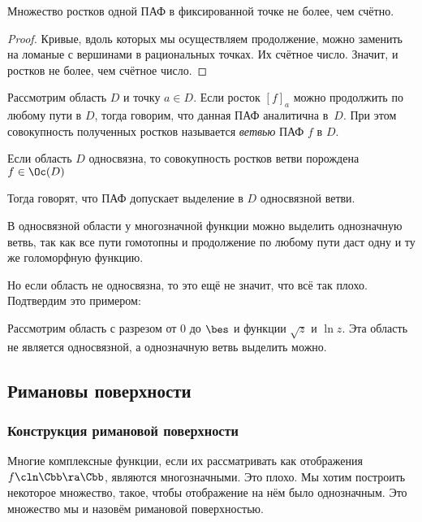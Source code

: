 \documentclass[a4paper]{article}
\begin{document}
\begin{theorem}[Вольтерра]
Множество ростков одной ПАФ в фиксированной точке не более, чем счётно.
\end{theorem}
\begin{proof}
Кривые, вдоль которых мы осуществляем продолжение, можно заменить на ломаные с вершинами в рациональных точках.
Их счётное число. Значит, и ростков не более, чем счётное число.
\end{proof}

\begin{df}
Рассмотрим область $D$ и точку $a\in D$. Если росток $[f]_a$ можно продолжить по любому пути в $D$,
тогда говорим, что данная ПАФ аналитична в~$D$.
При этом совокупность полученных ростков называется \emph{ветвью} ПАФ $f$ в $D$.
\end{df}

\begin{imp}
Если область $D$ односвязна, то совокупность ростков ветви порождена $f\in\Oc(D)$
 \end{imp}
 Тогда говорят, что ПАФ допускает выделение в $D$ односвязной ветви.

\begin{imp}
В односвязной области у многозначной функции можно выделить однозначную ветвь, так как все пути гомотопны
и продолжение по любому пути даст одну и ту же голоморфную функцию.
\end{imp}

Но если область не односвязна, то это ещё не значит, что всё так плохо. Подтвердим это примером:

\begin{ex}
Рассмотрим область с разрезом от $0$ до $\bes$ и функции $\sqrt z$ и $\ln z$.
Эта область не является односвязной, а однозначную ветвь выделить можно.
\end{ex}

\subsection{Римановы поверхности}

\subsubsection{Конструкция римановой поверхности}

Многие комплексные функции, если их рассматривать как отображения $f\cln \Cbb\ra\Cbb$, являются многозначными.
Это плохо. Мы хотим построить некоторое множество, такое, чтобы отображение на нём было однозначным. Это множество
мы и назовём римановой поверхностью.
\end{document}
